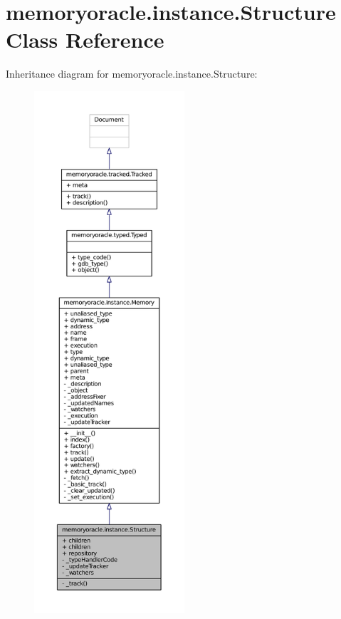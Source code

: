\hypertarget{classmemoryoracle_1_1instance_1_1Structure}{}\section{memoryoracle.\+instance.\+Structure Class Reference}
\label{classmemoryoracle_1_1instance_1_1Structure}


Inheritance diagram for memoryoracle.\+instance.\+Structure\+:
\nopagebreak
\begin{figure}[H]
\begin{center}
\leavevmode
\includegraphics[height=550pt]{classmemoryoracle_1_1instance_1_1Structure__inherit__graph}
\end{center}
\end{figure}


